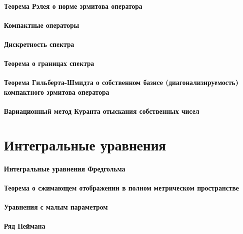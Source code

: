 \documentclass[russian,twocolumn]{article}
\begin{document}
\paragraph{Теорема Рэлея о норме эрмитова оператора}

\paragraph{Компактные операторы}

\paragraph{Дискретность спектра}

\paragraph{Теорема о границах спектра}

\paragraph{Теорема Гильберта-Шмидта о собственном базисе (диагонализируемость) компактного эрмитова оператора}

\paragraph{Вариационный метод Куранта отыскания собственных чисел}

\section{Интегральные уравнения}

\paragraph{Интегральные уравнения Фредгольма}

\paragraph{Теорема о сжимающем отображении в полном метрическом пространстве}

\paragraph{Уравнения с малым параметром}

\paragraph{Ряд Неймана}
\end{document}
